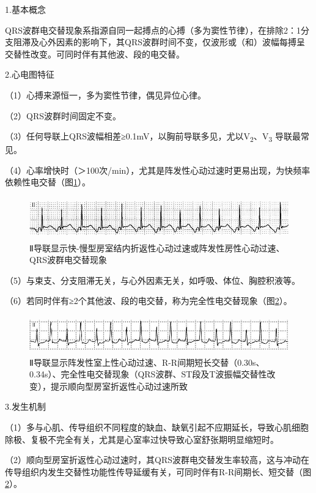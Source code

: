 1.基本概念

QRS波群电交替现象系指源自同一起搏点的心搏（多为窦性节律），在排除2：1分支阻滞及心外因素的影响下，其QRS波群时间不变，仅波形或（和）波幅每搏呈交替性改变。可同时伴有其他波、段的电交替。

2.心电图特征

（1）心搏来源恒一，多为窦性节律，偶见异位心律。

（2）QRS波群时间固定不变。

（3）任何导联上QRS波幅相差≥0.1mV，以胸前导联多见，尤以V\textsubscript{2}、V\textsubscript{3} 导联最常见。

（4）心率增快时（＞100次/min），尤其是阵发性心动过速时更易出现，为快频率依赖性电交替（图\ref{fig39-3}）。

\begin{figure}[!htbp]
 \centering
 \includegraphics[width=5.58333in,height=0.71875in]{./images/Image00652.jpg}
 \captionsetup{justification=centering}
 \caption{Ⅱ导联显示快-慢型房室结内折返性心动过速或阵发性房性心动过速、QRS波群电交替现象}
 \label{fig39-3}
  \end{figure} 

（5）与束支、分支阻滞无关，与心外因素无关，如呼吸、体位、胸腔积液等。

（6）若同时伴有≥2个其他波、段的电交替，称为完全性电交替现象（图\ref{fig39-4}）。

\begin{figure}[!htbp]
 \centering
 \includegraphics[width=5.61458in,height=0.64583in]{./images/Image00653.jpg}
 \captionsetup{justification=centering}
 \caption{Ⅱ导联显示阵发性室上性心动过速、R-R间期短长交替（0.30s、0.34s）、完全性电交替现象（QRS波群、ST段及T波振幅交替性改变），提示顺向型房室折返性心动过速所致}
 \label{fig39-4}
  \end{figure} 

3.发生机制

（1）多与心肌、传导组织不同程度的缺血、缺氧引起不应期延长，导致心肌细胞除极、复极不完全有关，尤其是心室率过快导致心室舒张期明显缩短时。

（2）顺向型房室折返性心动过速时，其QRS波群电交替发生率较高，这与冲动在传导组织内发生交替性功能性传导延缓有关，可同时伴有R-R间期长、短交替（图\ref{fig39-4}）。

